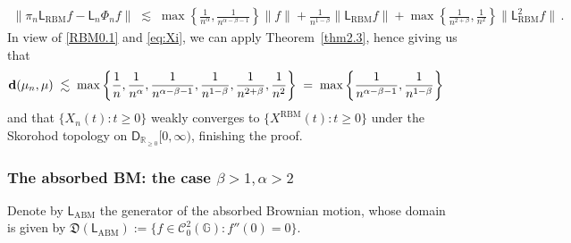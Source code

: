 \documentclass[12pt,a4paper]{article}
\theoremstyle{plain}
\theoremstyle{remark}
\newcommand{\msf}[1]{{\mathsf #1}}
\newcommand{\mc}[1]{{\mathcal #1}}
\newcommand{\mf}[1]{{\mathfrak #1}}
\newcommand{\bb}[1]{{\mathbb #1}}
\newcommand{\norm}[1]{\lVert#1\rVert}
\begin{document}
	\begin{equation}\label{RBM0.1}
		\begin{aligned}
			\norm{\pi_n\msf{L}_{\text{RBM}}f - \msf{L}_n\Phi_nf}\;\lesssim\;\max\left\{\frac{1}{n^{\alpha}}, \frac{1}{n^{\alpha-\beta-1}}\right\}\norm{f} + \frac{1}{n^{1-\beta}}\norm{\msf{L}_{\text{RBM}}f} + \max\left\{\frac{1}{n^{2 + \beta}},\frac{1}{n^2}\right\}\|\msf{L}^2_{\text{RBM}}f\|\,.
		\end{aligned}
	\end{equation}
	In view of \eqref{RBM0.1} and \eqref{eq:Xi}, we can apply Theorem~\ref{thm2.3}, hence giving us that
	\begin{equation*}
		\begin{aligned}
			{\bf d}(\mu_n,\mu) &  \;\lesssim\; \max\left\{\frac{1}{n},\frac{1}{n^\alpha},  \frac{1}{n^{\alpha - \beta-1}}, \frac{1}{n^{1 - \beta}}, \frac{1}{n^{2+\beta}}, \frac{1}{n^2} \right\}   \;=\; \max\left\{  \frac{1}{n^{\alpha-\beta -1}}, \frac{1}{n^{1-\beta}} \right\}
		\end{aligned}
	\end{equation*}
	and that  $\{X_{n}(t): t \geq 0\}$ weakly converges to $\{X^{\text{RBM}}(t): t\geq 0\}$ under the Skorohod topology on $\msf{D}_{\bb{R}_{\geq 0}}[0, \infty)$, finishing the proof.
	
	
	\subsubsection{The absorbed BM: the case \texorpdfstring{$\beta > 1, \alpha>2$}{beta>1, alpha >2}}
	Denote by $\msf{L}_\text{ABM}$ the generator of the absorbed Brownian motion, whose domain is given by
	$\mf{D}\left(\msf{L}_\text{ABM}\right) := \{f \in \mc{C}_0^2(\bb{G}):f''(0) = 0\}$.
	
\end{document}
